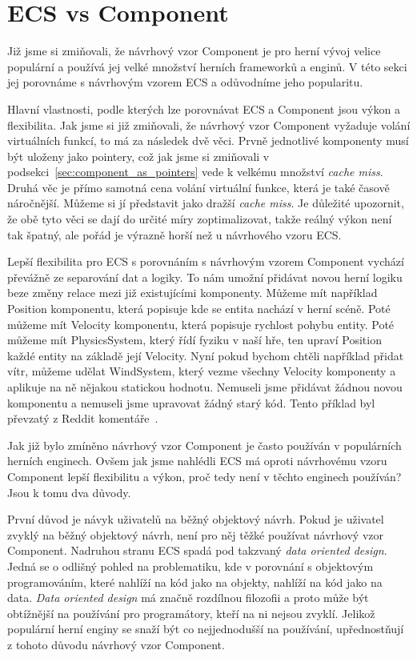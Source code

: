 \section{ECS vs Component}

Již jsme si zmiňovali, že návrhový vzor Component je pro herní vývoj velice populární a používá jej velké množství herních frameworků a enginů. V této sekci jej porovnáme s návrhovým vzorem ECS a odůvodníme jeho popularitu.

Hlavní vlastnosti, podle kterých lze porovnávat ECS a Component jsou výkon a flexibilita. Jak jsme si již zmiňovali, že návrhový vzor Component vyžaduje volání virtuálních funkcí, to má za následek dvě věci. Prvně jednotlivé komponenty musí být uloženy jako pointery, což jak jsme si zmiňovali v podsekci~\ref{sec:component_as_pointers} vede k velkému množství \textit{cache miss}. Druhá věc je přímo samotná cena volání virtuální funkce, která je také časově náročnější. Můžeme si jí představit jako dražší \textit{cache miss}. Je důležité upozornit, že obě tyto věci se dají do určité míry zoptimalizovat, takže reálný výkon není tak špatný, ale pořád je výrazně horší než u návrhového vzoru ECS.

Lepší flexibilita pro ECS s porovnáním s návrhovým vzorem Component vychází převážně ze separování dat a logiky. To nám umožní přidávat novou herní logiku beze změny relace mezi již existujícími komponenty. Můžeme mít například Position komponentu, která popisuje kde se entita nachází v herní scéně. Poté můžeme mít Velocity komponentu, která popisuje rychlost pohybu entity. Poté můžeme mít PhysicsSystem, který řídí fyziku v naší hře, ten upraví Position každé entity na základě její Velocity. Nyní pokud bychom chtěli například přidat vítr, můžeme udělat WindSystem, který vezme všechny Velocity komponenty a aplikuje na ně nějakou statickou hodnotu. Nemuseli jsme přidávat žádnou novou komponentu a nemuseli jsme upravovat žádný starý kód. Tento příklad byl převzatý z Reddit komentáře~\cite{ECSFlexibilityRedditExample}.

Jak již bylo zmíněno návrhový vzor Component je často používán v populárních herních enginech. Ovšem jak jsme nahlédli ECS má oproti návrhovému vzoru Component lepší flexibilitu a výkon, proč tedy není v těchto enginech používán? Jsou k tomu dva důvody.

První důvod je návyk uživatelů na běžný objektový návrh. Pokud je uživatel zvyklý na běžný objektový návrh, není pro něj těžké používat návrhový vzor Component. Nadruhou stranu ECS spadá pod takzvaný \textit{data oriented design}. Jedná se o odlišný pohled na problematiku, kde v porovnání s objektovým programováním, které nahlíží na kód jako na objekty, nahlíží na kód jako na data. \textit{Data oriented design} má značně rozdílnou filozofii a proto může být obtížnější na používání pro programátory, kteří na ni nejsou zvyklí. Jelikož populární herní enginy se snaží být co nejjednodušší na používání, upřednostňují z tohoto důvodu návrhový vzor Component.

